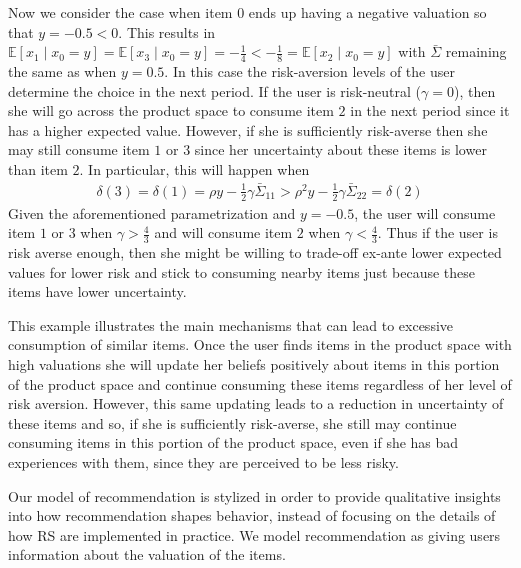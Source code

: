 \documentclass[manuscript, nonacm]{acmart}
\newcommand{\xhdr}[1]{\vspace{1mm} \noindent{\bf #1}}
\begin{document}
Now we consider the case when item 0 ends up having a negative valuation so that $y = -0.5 < 0$. This results in $\mathbb{E}[x_1\mid x_0=y] = \mathbb{E}[x_3\mid x_0=y] = -\frac{1}{4} <  -\frac{1}{8} = \mathbb{E}[x_2\mid x_0=y]$ with $\bar{\Sigma}$ remaining the same as when $y = 0.5$. In this case the risk-aversion levels of the user determine the choice in the next period. If the user is risk-neutral ($\gamma = 0$), then she will go across the product space to consume item $2$ in the next period since it has a higher expected value. However, if she is sufficiently risk-averse then she may still consume item $1$ or $3$ since her uncertainty about these items is lower than item $2$. In particular, this will happen when 
\begin{align*}
\delta(3) = \delta(1) = \rho y - \frac{1}{2} \gamma \bar{\Sigma}_{11} > \rho^{2} y - \frac{1}{2} \gamma \bar{\Sigma}_{22} = \delta(2)
\end{align*}
Given the aforementioned parametrization and $y = -0.5$, the user will consume item $1$ or $3$ when $\gamma > \frac{4}{3}$ and will consume item $2$ when $\gamma < \frac{4}{3}$. Thus if the user is risk averse enough, then she might be willing to trade-off ex-ante lower expected values for lower risk and stick to consuming nearby items just because these items have lower uncertainty. 
\par 
This example illustrates the main mechanisms that can lead to excessive consumption of similar items. Once the user finds items in the product space with high valuations she will update her beliefs positively about items in this portion of the product space and continue consuming these items regardless of her level of risk aversion. However, this same updating leads to a reduction in uncertainty of these items and so, if she is sufficiently risk-averse, she still may continue consuming items in this portion of the product space, even if she has bad experiences with them, since they are perceived to be less risky. 
\par

\xhdr{Recommendation.}
Our model of recommendation is stylized in order to provide qualitative insights into how recommendation shapes behavior, instead of focusing on the details of how RS are implemented in practice. We model recommendation as giving users information about the valuation of the items.
\par
\end{document}
